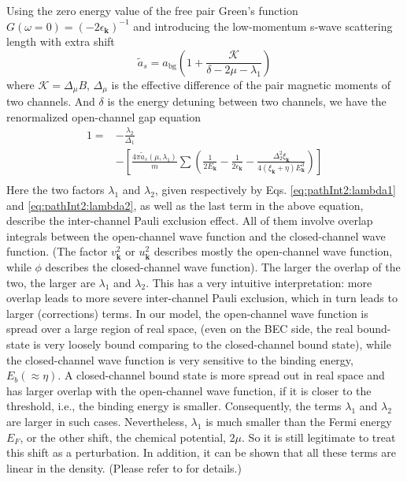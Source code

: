 \documentclass[reprint,pra]{revtex4-1}
\newcommand{\vk}{\ensuremath{\mathbf{k}}}
\newcommand{\nth}[1]{\ensuremath{\frac{1}{#1}}}
\newcommand{\mbr}[1]{\ensuremath{\left[#1\right]}}
\begin{document}
Using the zero energy value of the free pair Green's function $G(\omega=0)=(-2\epsilon_{\vk})^{-1}$ and introducing the low-momentum s-wave scattering length with extra shift 
\begin{equation}\label{eq:pathInt2:asKshift}
\tilde{a}_s=a_{\text{bg}}(1+\frac{\mathcal{K}}{\delta-2\mu-\lambda_{1}})
\end{equation}
where $\mathcal{K}=\Delta_{\mu}B$, $\Delta_{\mu}$ is the  effective difference of the pair magnetic moments of two channels. And  $\delta$ is the energy detuning between two channels, we have the renormalized open-channel gap equation
\begin{equation}
\begin{split}\label{eq:pathInt2:gapRenorm}
1=&-\frac{\lambda_{2}}{\Delta_{1}}\\
&-\mbr{\frac{4\pi{\tilde{a}_{s}(\mu,\lambda_{1})}}{m}\sum(\nth{2E_{\vk}}-\nth{2\epsilon_{\vk}}-\frac{\Delta_{2}^{2}\xi_{\vk}}{4(\xi_{\vk}+\eta){E_{\vk}^{3}}})}
	\\
\end{split}	
\end{equation}
Here the two factors $\lambda_1$ and $\lambda_2$, given respectively by Eqs. \eqref{eq:pathInt2:lambda1} and \eqref{eq:pathInt2:lambda2}, as well as the last term in the above equation, describe the inter-channel Pauli exclusion effect. All of them involve overlap integrals between the open-channel wave function and the closed-channel wave function.  (The factor $v_{\vk}^{2}$ or $u_{\vk}^{2}$ describes mostly the open-channel wave function, while $\phi$ describes the closed-channel wave function). The larger the overlap of the two, the larger are $\lambda_1$ and $\lambda_2$.  This has a very intuitive interpretation:  more overlap leads to more severe inter-channel Pauli exclusion, which in turn leads to larger (corrections) terms.  In our model, the open-channel wave function is  spread  over  a large region of  real space, (even on the BEC side, the real bound-state is very loosely bound comparing to the closed-channel bound state), while the closed-channel wave function is very sensitive to the binding energy, $E_{b}(\approx\eta)$.  A closed-channel bound state is more spread out  in real space and has larger overlap with the open-channel wave function,  if it is closer to the threshold, i.e.,  the binding energy  is smaller. Consequently,  the terms $\lambda_1$ and $\lambda_2$ are larger in such cases.                           Nevertheless, $\lambda_1$ is much smaller than the  Fermi energy $E_{F}$, or the other shift, the chemical potential, $2\mu$.  So it is still legitimate to treat this shift as a perturbation.  In addition, it can be shown that all these terms are linear in the density. (Please refer to \cite{Zhuthesis} for details.)
\end{document}
